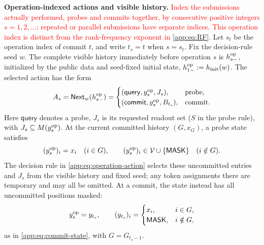 \begin{definition}[\textcolor{red}{Admissible algorithms}]
\smallskip
\noindent\textbf{Operation-indexed actions and visible history.}
\textcolor{red}{Index the submissions actually performed, probes and commits
together, by consecutive positive integers $s=1,2,\ldots$; repeated or
parallel submissions have separate indices. This operation index is
distinct from the rank-frequency exponent in \eqref{app:eq:RF}.}
Let $s_t$ be the operation index of commit $t$, and write $t_s=t$ when
$s=s_t$. Fix the decision-rule seed $w$.
The complete visible history immediately before operation $s$ is
$h^{\mathrm{op}}_{s-}$, initialized by the public data and seed-fixed
initial state, $h^{\mathrm{op}}_{1-}:=h_{\mathrm{init}}(w)$.
The selected action has the form
\begin{equation}
 A_s=\mathsf{Next}_w(h^{\mathrm{op}}_{s-})=
 \begin{cases}
  (\mathsf{query},y^{\mathrm{op}}_{s},J_s),
    &\text{probe},\\
  (\mathsf{commit},y^{\mathrm{op}}_{s},B_{t_s}),
    &\text{commit}.
 \end{cases}
 \label{app:eq:operation-action}
\end{equation}
Here $\mathsf{query}$ denotes a probe, $J_s$ is its requested readout set
($S$ in the probe rule), with
$J_s\subseteq M(y^{\mathrm{op}}_{s})$.
At the current committed history $(G,x_G)$, a probe state satisfies
\[
 (y^{\mathrm{op}}_{s})_i=x_i\quad(i\in G),
 \qquad
 (y^{\mathrm{op}}_{s})_i\in\mathcal V\cup\{\mathsf{MASK}\}\quad(i\notin G).
\]
The decision rule in \cref{app:eq:operation-action} selects these
uncommitted entries and $J_s$ from the visible history and fixed seed;
any token assignments there are temporary and may all be omitted.
At a commit, the state instead has all uncommitted positions masked:
\[
 y^{\mathrm{op}}_{s}=y_{t_s},
 \qquad
 (y_{t_s})_i=
 \begin{cases}
  x_i,&i\in G,\\
  \mathsf{MASK},&i\notin G,
 \end{cases}
\]
as in \cref{app:eq:commit-state}, with $G=G_{t_s-1}$.


\end{definition}
